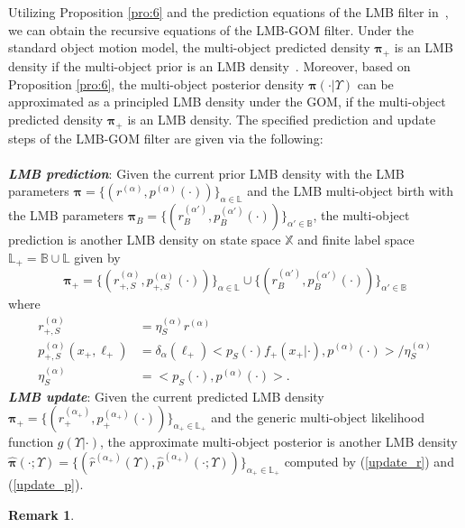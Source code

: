 \documentclass[journal]{IEEEtran}
\newcommand{\bpi}{{\boldsymbol\pi}}
\newtheorem{Rem}{Remark}
\begin{document}
{Utilizing Proposition \ref{pro:6} and the prediction equations of the LMB filter in~\cite{refr:label_5}, we   can obtain the recursive equations of the LMB-GOM filter. 
Under the standard object motion model, the  multi-object predicted density 
$\bpi_+$ is  an LMB density if the multi-object prior is an LMB density~\cite{refr:label_5}. Moreover, based on  Proposition \ref{pro:6}, the  multi-object posterior
density $\bpi(\cdot|\Upsilon)$ can  be approximated as a principled LMB density under the GOM, if the  multi-object predicted density $\bpi_+$ is an LMB density. The specified  prediction  and update steps of the LMB-GOM filter are given via the following:
\\
\\
\textit{\textbf{LMB prediction}}: Given the current prior LMB density with the LMB parameters $\bpi=\{(r^{(\alpha)},p^{(\alpha)}(\cdot))\}_{\alpha\in\mathbb{L}}$ and the LMB multi-object birth with the LMB parameters  $\bpi_B=\{(r_B^{(\alpha')},p_B^{(\alpha')}(\cdot))\}_{\alpha'\in\mathbb{B}}$,  the multi-object prediction is  another LMB density on state space $\mathbb{X}$ and finite label space $\mathbb{L}_+=\mathbb{B}\cup\mathbb{L}$ given by 
 \begin{equation}\label{prediction-LMB} \bpi_{+}=\{(r^{(\alpha)}_{+,S},p^{(\alpha)}_{+,S}(\cdot))\}_{\alpha\in\mathbb{L}}\cup\{(r^{(\alpha')}_{B},p^{(\alpha')}_{B}(\cdot))\}_{\alpha'\in\mathbb{B}}
 \end{equation}
 where
 \begin{align}
 \label{r-s} r^{(\alpha)}_{+,S}&=\eta_S^{(\alpha)}r^{(\alpha)} \\
  \label{p-s}p_{+,S}^{(\alpha)}(x_+,\ell_+)&=\delta_{\alpha}(\ell_+)\big<p_S(\cdot)f_+(x_+|\cdot),p^{(\alpha)}(\cdot)\big>\big/\eta_S^{(\alpha)}\\
\label{where_1}\eta_S^{(\alpha)}&=\big<p_S(\cdot),p^{(\alpha)}(\cdot)\big>.
 \end{align}
\textit{\textbf{LMB update}}: Given the current predicted LMB density
$\bpi_+=\{(r_+^{(\alpha_+)},p_+^{(\alpha_+)}(\cdot))\}_{\alpha_+\in\mathbb{L}_+}$ and 
  the generic multi-object likelihood function $g(\Upsilon|\cdot)$, the  approximate multi-object  posterior   is another LMB density   $\hat\bpi(\cdot;\Upsilon)=\{(\hat r^{(\alpha_+)}(\Upsilon),\hat p^{(\alpha_+)}(\cdot;\Upsilon))\}_{\alpha_+\in\mathbb{L}_+}$  computed by  (\ref{update_r}) and (\ref{update_p}).
\begin{Rem}\label{remark:5}

\end{Rem}}
\end{document}
